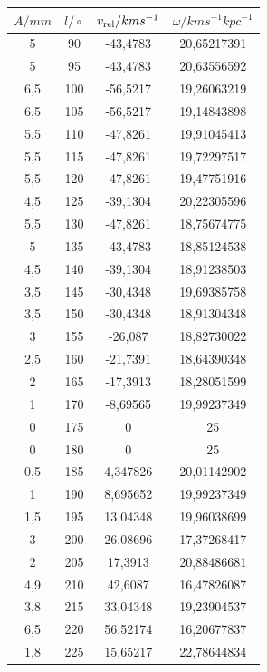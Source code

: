 \documentclass[12pt]{article}
\begin{document}
\begin{minipage}{.5\textwidth}
    \begin{tabular}{c|c|c|c|}
        $A / mm$ & $l /\circ$ & $v_{\textnormal{rel}} / kms^{-1}$ & $\omega / kms^{-1}kpc^{-1}$ \\ \hline
        5 & 90 & -43,4783 & 20,65217391 \\ 
        5 & 95 & -43,4783 & 20,63556592 \\ 
        6,5 & 100 & -56,5217 & 19,26063219 \\ 
        6,5 & 105 & -56,5217 & 19,14843898 \\ 
        5,5 & 110 & -47,8261 & 19,91045413 \\ 
        5,5 & 115 & -47,8261 & 19,72297517 \\ 
        5,5 & 120 & -47,8261 & 19,47751916 \\ 
        4,5 & 125 & -39,1304 & 20,22305596 \\ 
        5,5 & 130 & -47,8261 & 18,75674775 \\ 
        5 & 135 & -43,4783 & 18,85124538 \\ 
        4,5 & 140 & -39,1304 & 18,91238503 \\ 
        3,5 & 145 & -30,4348 & 19,69385758 \\ 
        3,5 & 150 & -30,4348 & 18,91304348 \\ 
        3 & 155 & -26,087 & 18,82730022 \\ 
        2,5 & 160 & -21,7391 & 18,64390348 \\ 
        2 & 165 & -17,3913 & 18,28051599 \\ 
        1 & 170 & -8,69565 & 19,99237349 \\ 
        0 & 175 & 0 & 25 \\ 
        0 & 180 & 0 & 25 \\ 
        0,5 & 185 & 4,347826 & 20,01142902 \\ 
        1 & 190 & 8,695652 & 19,99237349 \\ 
        1,5 & 195 & 13,04348 & 19,96038699 \\ 
        3 & 200 & 26,08696 & 17,37268417 \\ 
        2 & 205 & 17,3913 & 20,88486681 \\ 
        4,9 & 210 & 42,6087 & 16,47826087 \\ 
        3,8 & 215 & 33,04348 & 19,23904537 \\ 
        6,5 & 220 & 56,52174 & 16,20677837 \\ 
        1,8 & 225 & 15,65217 & 22,78644834 \\ 

\end{tabular}
\end{minipage}
\end{document}
